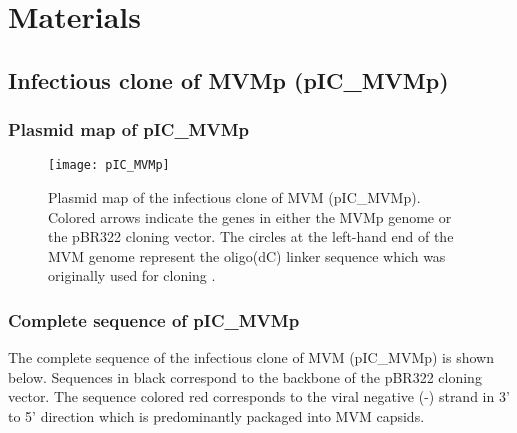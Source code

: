 
\chapter{Materials} %

\label{Materials} %


\section{Infectious clone of MVMp (pIC\_MVMp)}
\label{IC}


\subsection{Plasmid map of pIC\_MVMp}

\begin{figure}[h] 
\begin{center}
\texttt{[image: pIC\_MVMp]}
\caption[Plasmid map of the infectious clone of MVMp]{Plasmid map of the infectious clone of MVM (pIC\_MVMp). Colored arrows indicate the genes in either the MVMp genome or the pBR322 cloning vector. The circles at the left-hand end of the MVM genome represent the oligo(dC) linker sequence which was originally used for cloning \cite{pmid6345805}.}
\label{pIC}
\end{center}
\end{figure}

\subsection{Complete sequence of pIC\_MVMp}
\label{sequence}

\raggedright
The complete sequence of the infectious clone of MVM (pIC\_MVMp) is shown below. Sequences in black correspond to the backbone of the pBR322 cloning vector. The sequence colored red corresponds to the viral negative (-) strand in 3' to 5' direction which is predominantly packaged into MVM capsids.  


